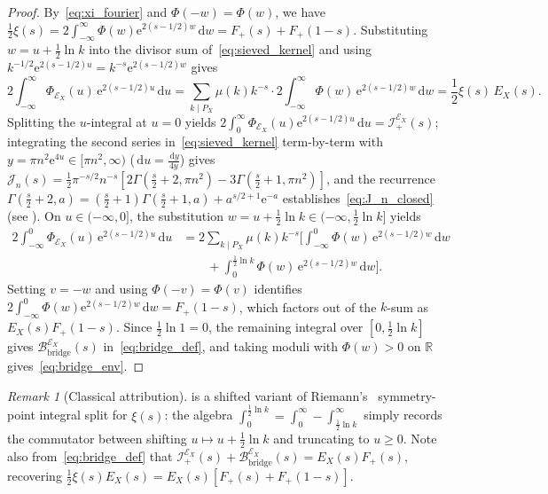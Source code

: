 \documentclass[11pt,reqno]{amsart}
\theoremstyle{plain}
\theoremstyle{definition}
\theoremstyle{remark}
\newtheorem{remark}[theorem]{Remark}
\numberwithin{equation}{section}
\newcommand{\dd}{\,\mathrm{d}}
\newcommand{\ee}{\mathrm{e}}
\begin{document}
\begin{proof}
By~\eqref{eq:xi_fourier} and $\Phi(-w) = \Phi(w)$, we have $\frac{1}{2}\xi(s) = 2\int_{-\infty}^{\infty}\Phi(w)\ee^{2(s-1/2)w}\dd w = F_+(s) + F_+(1-s)$. Substituting $w = u + \frac{1}{2}\ln k$ into the divisor sum of~\eqref{eq:sieved_kernel} and using $k^{-1/2}\ee^{2(s-1/2)u} = k^{-s}\ee^{2(s-1/2)w}$ gives
\[
2\int_{-\infty}^{\infty} \Phi_{\mathcal{E}_X}(u)\,\ee^{2(s-1/2)u}\dd u = \sum_{k \mid P_X} \mu(k)k^{-s}\cdot 2\int_{-\infty}^{\infty} \Phi(w)\,\ee^{2(s-1/2)w}\dd w = \frac{1}{2}\xi(s)\,E_X(s).
\]
Splitting the $u$-integral at $u = 0$ yields $2\int_0^{\infty} \Phi_{\mathcal{E}_X}(u)\ee^{2(s-1/2)u}\dd u = \mathcal{I}_+^{\mathcal{E}_X}(s)$; integrating the second series in~\eqref{eq:sieved_kernel} term-by-term with $y = \pi n^2\ee^{4u} \in [\pi n^2, \infty)$ ($\dd u = \frac{\dd y}{4y}$) gives $\mathcal{J}_n(s) = \frac{1}{2}\pi^{-s/2}n^{-s}[2\Gamma(\frac{s}{2}+2,\pi n^2) - 3\Gamma(\frac{s}{2}+1,\pi n^2)]$, and the recurrence $\Gamma(\frac{s}{2}+2,a) = (\frac{s}{2}+1)\Gamma(\frac{s}{2}+1,a) + a^{s/2+1}\ee^{-a}$ establishes~\eqref{eq:J_n_closed} (see ). On $u \in (-\infty, 0]$, the substitution $w = u + \frac{1}{2}\ln k \in (-\infty, \frac{1}{2}\ln k]$ yields
\begin{align*}
2\int_{-\infty}^0 \Phi_{\mathcal{E}_X}(u)\,\ee^{2(s-1/2)u}\dd u
&= 2\sum_{k \mid P_X} \mu(k)k^{-s}\biggl[\int_{-\infty}^0 \Phi(w)\,\ee^{2(s-1/2)w}\dd w \\
&\qquad + \int_0^{\frac{1}{2}\ln k} \Phi(w)\,\ee^{2(s-1/2)w}\dd w\biggr].
\end{align*}
Setting $v = -w$ and using $\Phi(-v) = \Phi(v)$ identifies $2\int_{-\infty}^0 \Phi(w)\ee^{2(s-1/2)w}\dd w = F_+(1-s)$, which factors out of the $k$-sum as $E_X(s)F_+(1-s)$. Since $\frac{1}{2}\ln 1 = 0$, the remaining integral over $[0, \frac{1}{2}\ln k]$ gives $\mathcal{B}_{\mathrm{bridge}}^{\mathcal{E}_X}(s)$ in~\eqref{eq:bridge_def}, and taking moduli with $\Phi(w) > 0$ on $\mathbb{R}$ gives~\eqref{eq:bridge_env}.
\end{proof}

\begin{remark}[Classical attribution]\label{rem:riemann_split}
 is a shifted variant of Riemann's~\cite{riemann1859} symmetry-point integral split for $\xi(s)$: the algebra $\int_0^{\frac{1}{2}\ln k} = \int_0^{\infty} - \int_{\frac{1}{2}\ln k}^{\infty}$ simply records the commutator between shifting $u \mapsto u + \frac{1}{2}\ln k$ and truncating to $u \ge 0$. Note also from~\eqref{eq:bridge_def} that $\mathcal{I}_+^{\mathcal{E}_X}(s) + \mathcal{B}_{\mathrm{bridge}}^{\mathcal{E}_X}(s) = E_X(s)F_+(s)$, recovering $\frac{1}{2}\xi(s)E_X(s) = E_X(s)[F_+(s) + F_+(1-s)]$.
\end{remark}
\end{document}
